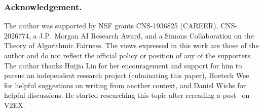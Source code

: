 \subsubsection{Acknowledgement.}
The author was supported by NSF grants CNS-1936825 (CAREER), CNS-2026774, a J.P.~Morgan AI Research Award, and a Simons Collaboration on the Theory of Algorithmic Fairness.
The views expressed in this work are those of the author and do not reflect the official policy or position of any of the supporters.
The author thanks Huijia Lin for her encouragement and support
for him to pursue an independent research project (culminating this paper),
Hoeteck Wee for helpful suggestions on writing from another context,
and Daniel Wichs for helpful discussions.
He started researching this topic after rereading a post~\cite{V2EX:759538} on V2EX\@.
